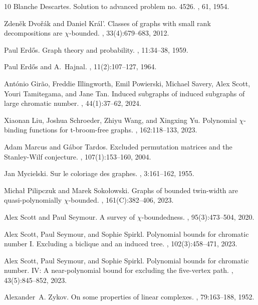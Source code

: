 \documentclass[11pt]{article}
\numberwithin{equation}{section}
\begin{document}
\begin{thebibliography}{10}
Blanche Descartes.
\newblock Solution to advanced problem no. 4526.
, 61, 1954.

Zdeněk Dvořák and Daniel Král’.
\newblock Classes of graphs with small rank decompositions are $\chi$-bounded.
, 33(4):679--683, 2012.

Paul Erd\H{o}s.
\newblock Graph theory and probability.
, 11:34--38, 1959.

Paul Erdős and A.~Hajnal.
, 11(2):107--127, 1964.

Ant{\'{o}}nio Gir{\~{a}}o, Freddie Illingworth, Emil Powierski, Michael Savery,
  Alex Scott, Youri Tamitegama, and Jane Tan.
\newblock Induced subgraphs of induced subgraphs of large chromatic number.
, 44(1):37--62, 2024.

Xiaonan Liu, Joshua Schroeder, Zhiyu Wang, and Xingxing Yu.
\newblock Polynomial $\chi$-binding functions for t-broom-free graphs.
, 162:118--133, 2023.

Adam Marcus and G{\'a}bor Tardos.
\newblock Excluded permutation matrices and the {S}tanley-{W}ilf conjecture.
, 107(1):153--160,
  2004.

Jan Mycielski.
\newblock Sur le coloriage des graphes.
, 3:161--162, 1955.

Micha\l{} Pilipczuk and Marek Soko\l{}owski.
\newblock Graphs of bounded twin-width are quasi-polynomially $\chi$-bounded.
, 161(C):382--406, 2023.

Alex Scott and Paul Seymour.
\newblock A survey of $\chi$-boundedness.
, 95(3):473--504, 2020.

Alex Scott, Paul Seymour, and Sophie Spirkl.
\newblock Polynomial bounds for chromatic number {I}. {E}xcluding a biclique
  and an induced tree.
, 102(3):458--471, 2023.

Alex Scott, Paul Seymour, and Sophie Spirkl.
\newblock Polynomial bounds for chromatic number. {IV}: A near-polynomial bound
  for excluding the five-vertex path.
, 43(5):845--852, 2023.

Alexander~A. Zykov.
\newblock On some properties of linear complexes.
, 79:163--188, 1952.

\end{thebibliography}
\end{document}
